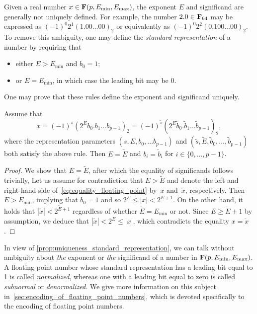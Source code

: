 Given a real number $x \in \mathbf F (p, E_{\min}, E_{\max})$,
the exponent $E$ and significand  are generally not uniquely defined.
For example, the number $2.0 \in \mathbf F_{64}$ may be expressed as $(-1)^0 2^1 (1.00\dots00)_2$ or equivalently as $(-1)^0 2^{2} (0.100\dots00)_2$.
To remove this ambiguity,
one may define the \emph{standard representation} of a number by requiring that
\begin{itemize}
    \item either $E > E_{\min}$ and $b_0 = 1$;
    \item or $E = E_{\min}$, in which case the leading bit may be 0.
\end{itemize}
One may prove that these rules define the exponent and significand uniquely.
\begin{proposition}
    \label{prop:uniqueness_standard_representation}
    Assume that
    \begin{equation}
        \label{eq:equality_floating_point}
        x = (-1)^s (2^{E} b_0.b_1\dots b_{p-1})_2 = (-1)^{\widetilde s} (2^{\widetilde E} \widetilde b_0. \widetilde b_1\dots \widetilde b_{p-1})_2,
    \end{equation}
    where the representation parameters $(s, E, b_0, \dots b_{p-1})$ and $(\widetilde s, \widetilde E, \widetilde b_0, \dots, \widetilde b_{p-1})$ both satisfy the above rule.
    Then $E = \widetilde E$ and $b_i = \widetilde b_i$ for $i \in \{0, \dots, p-1\}$.
\end{proposition}
\begin{proof}
    We show that $E = \widetilde E$,
    after which the equality of significands follows trivially,
    Let us assume for contradiction that $E > \widetilde E$
    and denote the left and right-hand side of~\eqref{eq:equality_floating_point} by~$x$ and~$\widetilde x$, respectively.
    Then~$E > E_{\min}$, implying that $b_0 = 1$ and so $2^{E} \leq |x| < 2^{E+1}$.
    On the other hand, it holds that $|\widetilde x| < 2^{\widetilde E+1}$ regardless of whether $\widetilde E = E_{\min}$ or not.
    Since $E \geq \widetilde E + 1$ by assumption,
    we deduce that $|\widetilde x| < 2^E \leq |x|$,
    which contradicts the equality $x = \widetilde x$.
\end{proof}

In view of \cref{prop:uniqueness_standard_representation},
we can talk without ambiguity about \emph{the} exponent or \emph{the} significand of a number in $\mathbf F (p, E_{\min}, E_{\max})$.
A floating point number whose standard representation has a leading bit equal to 1 is called \emph{normalized},
whereas one with a leading bit equal to zero is called \emph{subnormal} or \emph{denormalized}.
We give more information on this subject in~\cref{sec:encoding_of_floating_point_numbers},
which is devoted specifically to the encoding of floating point numbers.

